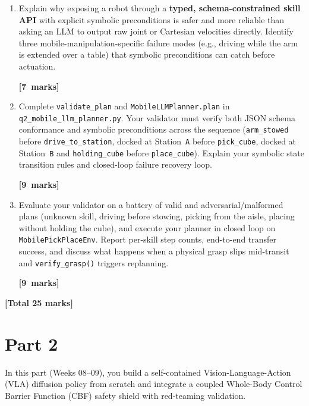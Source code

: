 \documentclass[11pt,a4paper]{article}
\newcommand{\qmarks}[1]{\par\nopagebreak\noindent\hfill\mbox{\textbf{[#1 marks]}}}
\newcommand{\qtotal}[1]{\par\smallskip\noindent\hfill\textbf{[Total #1 marks]}\par\medskip}
\begin{document}
\begin{enumerate}[label=\textbf{\arabic*.}, leftmargin=1.4em, itemsep=1.0em]
\begin{enumerate}[label=\textbf{\alph*.}, leftmargin=1.6em, itemsep=0.45em]
    \item Explain why exposing a robot through a \textbf{typed, schema-constrained skill API} with explicit symbolic preconditions is safer and more reliable than asking an LLM to output raw joint or Cartesian velocities directly. Identify three mobile-manipulation-specific failure modes (e.g., driving while the arm is extended over a table) that symbolic preconditions can catch before actuation. \qmarks{7}

    \item Complete \texttt{validate\_plan} and \texttt{MobileLLMPlanner.plan} in \texttt{q2\_mobile\_llm\_planner.py}. Your validator must verify both JSON schema conformance and symbolic preconditions across the sequence (\texttt{arm\_stowed} before \texttt{drive\_to\_station}, docked at Station~\texttt{A} before \texttt{pick\_cube}, docked at Station~\texttt{B} and \texttt{holding\_cube} before \texttt{place\_cube}). Explain your symbolic state transition rules and closed-loop failure recovery loop. \qmarks{9}

    \item Evaluate your validator on a battery of valid and adversarial/malformed plans (unknown skill, driving before stowing, picking from the aisle, placing without holding the cube), and execute your planner in closed loop on \texttt{MobilePickPlaceEnv}. Report per-skill step counts, end-to-end transfer success, and discuss what happens when a physical grasp slips mid-transit and \texttt{verify\_grasp()} triggers replanning. \qmarks{9}
\end{enumerate}
\qtotal{25}

\newpage

\section*{Part 2}
In this part (Weeks 08--09), you build a self-contained Vision-Language-Action (VLA) diffusion policy from scratch and integrate a coupled Whole-Body Control Barrier Function (CBF) safety shield with red-teaming validation.


\end{enumerate}
\end{document}
